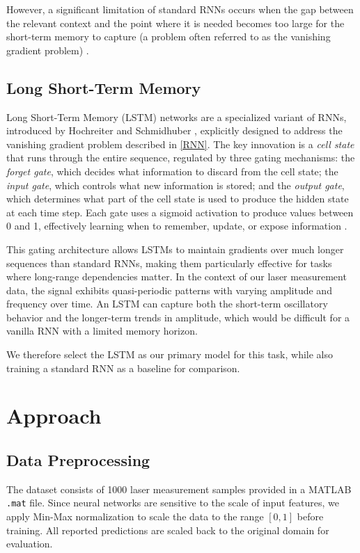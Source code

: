 \documentclass[conference]{IEEEtran}
\begin{document}
However, a significant limitation of standard RNNs occurs when the gap between the relevant context and the point where it is needed becomes too large for the short-term memory to capture (a problem often referred to as the vanishing gradient problem) \cite{b5}.

\subsection{Long Short-Term Memory}
\label{LSTM}
Long Short-Term Memory (LSTM) networks are a specialized variant of RNNs, introduced by Hochreiter and Schmidhuber \cite{b6}, explicitly designed to address the vanishing gradient problem described in \cref{RNN}. The key innovation is a \emph{cell state} that runs through the entire sequence, regulated by three gating mechanisms: the \emph{forget gate}, which decides what information to discard from the cell state; the \emph{input gate}, which controls what new information is stored; and the \emph{output gate}, which determines what part of the cell state is used to produce the hidden state at each time step. Each gate uses a sigmoid activation to produce values between 0 and 1, effectively learning when to remember, update, or expose information \cite{b7}.

This gating architecture allows LSTMs to maintain gradients over much longer sequences than standard RNNs, making them particularly effective for tasks where long-range dependencies matter. In the context of our laser measurement data, the signal exhibits quasi-periodic patterns with varying amplitude and frequency over time. An LSTM can capture both the short-term oscillatory behavior and the longer-term trends in amplitude, which would be difficult for a vanilla RNN with a limited memory horizon.

We therefore select the LSTM as our primary model for this task, while also training a standard RNN as a baseline for comparison.

\section{Approach}
\label{Approach}

\subsection{Data Preprocessing}
The dataset consists of 1000 laser measurement samples provided in a MATLAB \texttt{.mat} file. Since neural networks are sensitive to the scale of input features, we apply Min-Max normalization to scale the data to the range $[0, 1]$ before training. All reported predictions are scaled back to the original domain for evaluation.
\end{document}
